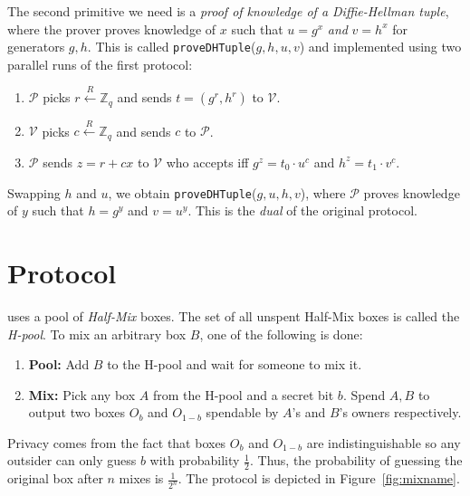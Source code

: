 \documentclass[runningheads]{llncs}
\begin{document}
The second primitive we need is a {\em proof of knowledge of a Diffie-Hellman tuple}, where the prover proves knowledge of $x$ such that $u = g^x$ {\em and} $v = h^x$ for generators $g, h$.
This is called \texttt{proveDHTuple}($g, h, u, v$) and implemented using two parallel runs of the first protocol:

\begin{enumerate}
	\item $\mathcal{P}$ picks $r \stackrel{R}{\leftarrow} \mathbb{Z}_q$ and sends $t = ({g}^r, {h}^r)$ to $\mathcal{V}$.
	\item $\mathcal{V}$ picks $c \stackrel{R}{\leftarrow} \mathbb{Z}_q$ and sends $c$ to $\mathcal{P}$.
	\item $\mathcal{P}$ sends $z = r + cx$ to $\mathcal{V}$ who accepts iff ${g}^z = {t_0}\cdot {u}^c$ and $h^z=t_1\cdot v^c$.
\end{enumerate}

Swapping $h$ and $u$, we obtain \texttt{proveDHTuple}($g, u, h, v$), where $\mathcal{P}$ proves knowledge of $y$ such that $h = g^y$ and $v = u^y$. This is the {\em dual} of the original protocol.


\section{\algname Protocol}

\algname uses a pool of {\em Half-Mix} boxes. The set of all unspent Half-Mix boxes is called the {\em H-pool}. To mix an arbitrary box $B$, one of the following is done:
\begin{enumerate}
	\item \textbf{Pool:} Add $B$ to the H-pool and wait for someone to mix it.
	\item \textbf{Mix:} Pick any box $A$ from the H-pool and a secret bit $b$. Spend $A, B$ to 
	output two boxes $O_b$ and $O_{1-b}$ spendable by $A$'s and $B$'s owners respectively.
\end{enumerate}

Privacy comes from the fact that boxes $O_b$ and $O_{1-b}$ are indistinguishable so any outsider can only guess $b$ with probability $\frac{1}{2}$. Thus, the probability of guessing the original box after $n$ mixes is $\frac{1}{2^n}$. The protocol is depicted in Figure~\ref{fig:mixname}. 
\end{document}
